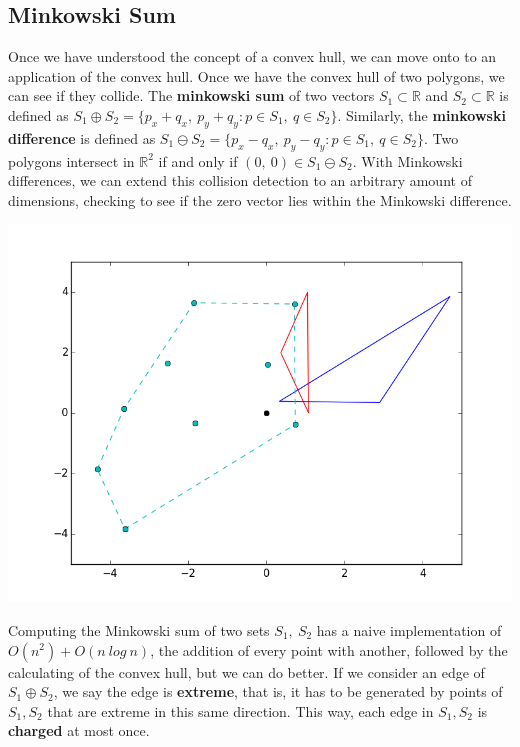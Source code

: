 \documentclass[12pt]{article}
\begin{document}
\begin{multicols}{2}
\subsection{Minkowski Sum}
\indent Once we have understood the concept of a convex hull, we can move onto to an application of the convex hull. Once we have the convex hull of two polygons, we can see if they collide. The \textbf{minkowski sum} of two vectors $S_1 \subset \mathbb{R}$ and $S_2 \subset \mathbb{R}$ is defined as $S_1 \oplus S_2 = \{p_x + q_x,\ p_y + q_y : p \in S_1,\ q \in S_2\}$. Similarly, the \textbf{minkowski difference} is defined as $S_1 \ominus S_2 = \{p_x - q_x,\ p_y - q_y : p \in S_1,\ q \in S_2\}$. Two polygons intersect in $\mathbb{R}^2$ if and only if $(0,\ 0) \in S_1 \ominus S_2$. With Minkowski differences, we can extend this collision detection to an arbitrary amount of dimensions, checking to see if the zero vector lies within the Minkowski difference.
\centerline{\includegraphics[scale=0.4]{minkowski_colliding.png}} 
\indent Computing the Minkowski sum of two sets $S_1,\ S_2$ has a naive implementation of $O(n^2) + O(n\ log\ n)$, the addition of every point with another, followed by the calculating of the convex hull, but we can do better. If we consider an edge of $S_1 \oplus S_2$, we say the edge is \textbf{extreme}, that is, it has to be generated by points of $S_1, S_2$ that are extreme in this same direction. This way, each edge in $S_1, S_2$ is \textbf{charged} at most once.

\end{multicols}
\end{document}
